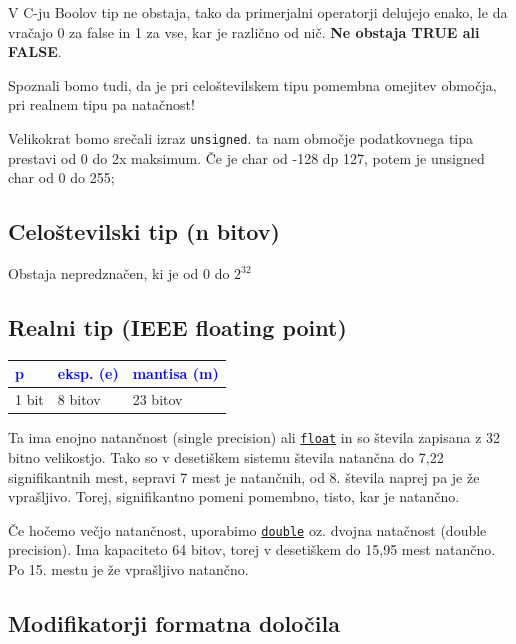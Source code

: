 \documentclass[a4paper, 12pt]{article}
\begin{document}

V C-ju Boolov tip ne obstaja, tako da primerjalni operatorji delujejo enako, le da vračajo 0 za false in 1 za vse, kar je različno od nič. \textbf{Ne obstaja TRUE ali FALSE}.\

Spoznali bomo tudi, da je pri celoštevilskem tipu pomembna omejitev območja, pri realnem tipu pa natačnost!

Velikokrat bomo srečali izraz \lstinline|unsigned|. ta nam območje podatkovnega tipa prestavi od 0 do 2x maksimum. Če je char od -128 dp 127, potem je unsigned char od 0 do 255;

\subsection{Celoštevilski tip (n bitov)}

Obstaja nepredznačen, ki je od 0 do $2^{32}$

\subsection{Realni tip (IEEE floating point)}

\begin{center}
	\begin{tabular}{|l|l|l|}
		\hline \textcolor{blue}{p} & \textcolor{blue}{eksp. (e)} & \textcolor{blue}{mantisa (m)} \\ \hline
		1 bit & 8 bitov & 23 bitov \\ \hline
	\end{tabular}
\end{center}

Ta ima enojno natančnost (single precision) ali \underline{\texttt{float}} in so števila zapisana z 32 bitno velikostjo. Tako so v desetiškem sistemu števila natančna do 7,22 signifikantnih mest, sepravi 7 mest je natančnih, od 8. števila naprej pa je že vprašljivo. Torej, signifikantno pomeni pomembno, tisto, kar je natančno.\

Če hočemo večjo natančnost, uporabimo \underline{\texttt{double}} oz. dvojna natačnost (double precision). Ima kapaciteto 64 bitov, torej v desetiškem do 15,95 mest natančno. Po 15. mestu je že vprašljivo natančno.

\pagebreak

\subsection{Modifikatorji formatna določila}
\end{document}
